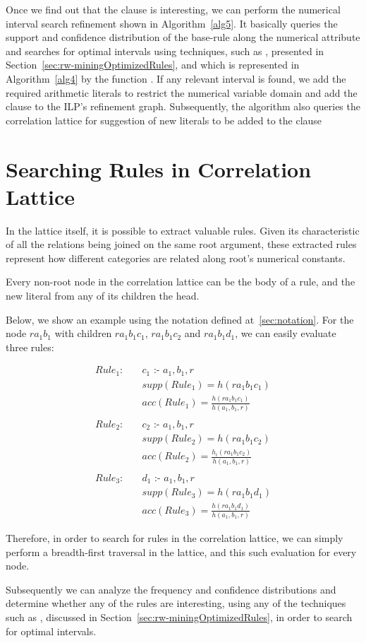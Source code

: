 Once we find out that the clause is interesting, we can perform the numerical interval search refinement
shown in Algorithm~\ref{alg5}. It basically queries the support and confidence distribution of the base-rule along the
numerical attribute and searches for optimal intervals using techniques, such as \cite{Brin99miningoptimized}, presented
in Section~\ref{sec:rw-miningOptimizedRules}, and which is represented in Algorithm~\ref{alg4} by the function
. If any relevant interval is found, we add the required arithmetic literals to
restrict the numerical variable domain and add the clause to the ILP's refinement graph. Subsequently, the
algorithm also queries the correlation lattice for suggestion of new literals to be added to the clause


\section{Searching Rules in Correlation Lattice}
\label{sec:searchRulesInCL}

In the lattice itself, it is possible to extract valuable rules. Given its characteristic of all the relations being
joined on the same root argument, these extracted rules represent how different categories are related along root's
numerical constants.

Every non-root node in the correlation lattice can be the body of a rule, and the new literal from any of
its children the head. 

Below, we show an example using the notation defined at~\ref{sec:notation}. For the node $r a_1 b_1$ with children $r
a_1 b_1 c_1$, $r a_1 b_1 c_2$ and $r a_1 b_1 d_1$, we can easily evaluate three rules:

\begin{align*}
Rule_1: \quad &c_1\text{ :- }a_1,b_1,r \\ 
&supp(Rule_1) = h(r a_1 b_1 c_1) \\
&acc(Rule_1) = \frac{h(r a_1 b_1 c_1)}{h(a_1,b_1,r)} \\ \\
Rule_2: \quad &c_2\text{ :- }a_1,b_1,r \\
 &supp(Rule_2) = h(r a_1 b_1 c_2) \\
 &acc(Rule_2) = \frac{h_i(r a_1 b_1 c_2)}{h(a_1,b_1,r)} \\ \\
Rule_3: \quad &d_1\text{ :- }a_1,b_1,r \\
 &supp(Rule_3) = h(r a_1 b_1 d_1) \\
 &acc(Rule_3) = \frac{h(r a_1 b_1 d_1)}{h(a_1,b_1,r)} 
\end{align*}

Therefore, in order to search for rules in the correlation lattice, we can simply perform a breadth-first traversal in
the lattice, and this such evaluation for every node. 

Subsequently we can analyze the frequency and confidence distributions and determine whether any of the rules are
interesting, using any of the techniques such as \citet{Brin99miningoptimized}, discussed
in Section~\ref{sec:rw-miningOptimizedRules}, in order to search for optimal intervals.
